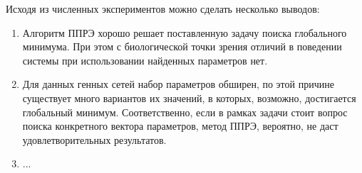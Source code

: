 Исходя из численных экспериментов можно сделать несколько выводов:

\begin{enumerate}
  \item Алгоритм ППРЭ хорошо решает поставленную задачу поиска глобального 
  минимума. При этом с биологической точки зрения отличий в поведении системы 
  при использовании найденных параметров нет.
  \item Для данных генных сетей набор параметров обширен, по этой причине 
  существует много вариантов их значений, в которых, возможно, достигается 
  глобальный минимум. Соответственно, если в рамках задачи стоит вопрос поиска 
  конкретного вектора параметров, метод ППРЭ, вероятно, не даст 
  удовлетворительных результатов.
  \item ...
\end{enumerate}


\clearpage
